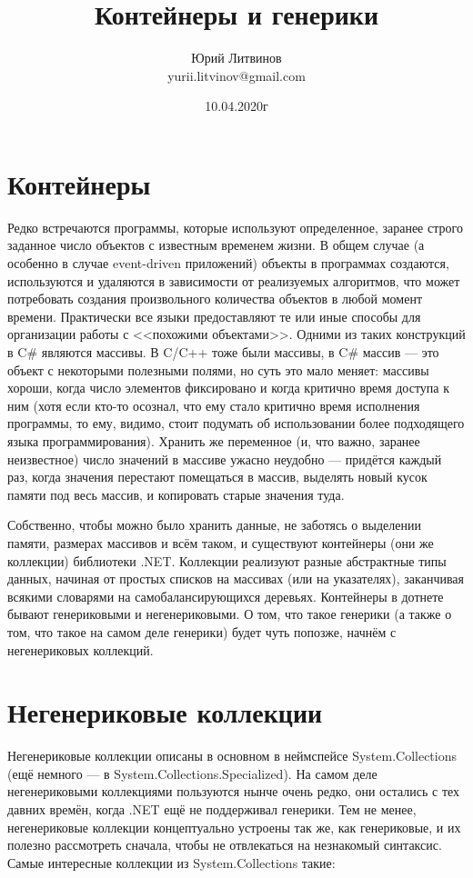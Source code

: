 \documentclass[a5paper]{article}
\title{Контейнеры и генерики}
\author{Юрий Литвинов\\\small{yurii.litvinov@gmail.com}}
\date{10.04.2020г}
\begin{document}
\maketitle
\thispagestyle{empty}

\section{Контейнеры}

Редко встречаются программы, которые используют определенное, заранее строго заданное число объектов с известным временем жизни. В общем случае (а особенно в случае event-driven приложений) объекты в программах создаются, используются и удаляются в зависимости от реализуемых алгоритмов, что может потребовать создания произвольного количества объектов в любой момент времени. Практически все языки предоставляют те или иные способы для организации работы с <<похожими объектами>>. Одними из таких конструкций в C\# являются массивы. В C/C++ тоже были массивы, в C\# массив --- это объект с некоторыми полезными полями, но суть это мало меняет: массивы хороши, когда число элементов фиксировано и когда критично время доступа к ним (хотя если кто-то осознал, что ему стало критично время исполнения программы, то ему, видимо, стоит подумать об использовании более подходящего языка программирования). Хранить же переменное (и, что важно, заранее неизвестное) число значений в массиве ужасно неудобно --- придётся каждый раз, когда значения перестают помещаться в массив, выделять новый кусок памяти под весь массив, и копировать старые значения туда.

Собственно, чтобы можно было хранить данные, не заботясь о выделении памяти, размерах массивов и всём таком, и существуют контейнеры (они же коллекции) библиотеки .NET. Коллекции реализуют разные абстрактные типы данных, начиная от простых списков на массивах (или на указателях), заканчивая всякими словарями на самобалансирующихся деревьях. Контейнеры в дотнете бывают генериковыми и негенериковыми. О том, что такое генерики (а также о том, что такое на самом деле генерики) будет чуть попозже, начнём с негенериковых коллекций.

\section{Негенериковые коллекции}

Негенериковые коллекции описаны в основном в неймспейсе System.Collections (ещё немного --- в System.Collections.Specialized). На самом деле негенериковыми коллекциями пользуются нынче очень редко, они остались с тех давних времён, когда .NET ещё не поддерживал генерики. Тем не менее, негенериковые коллекции концептуально устроены так же, как генериковые, и их полезно рассмотреть сначала, чтобы не отвлекаться на незнакомый синтаксис. Самые интересные коллекции из System.Collections такие:
\end{document}
